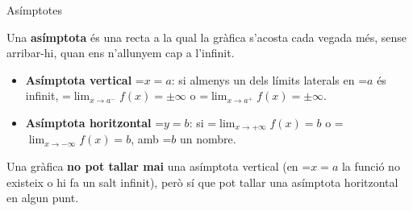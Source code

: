 \documentclass[11pt,a4paper]{article}
\newcommand{\fmm}[1]{\setbox0=\hbox{$#1$}\ifdim\wd0>\linewidth\[#1\]\else\mbox{\box0}\fi}
\begin{document}
  

  
\begin{fmdef}{Asímptotes}
\par\noindent \begin{minipage}[t]{0.48\linewidth}\vspace{0pt}\raggedright Una \textbf{asímptota} és una recta a la qual la gràfica s'acosta cada vegada més, sense arribar-hi, quan ens n'allunyem cap a l'infinit.

          
\begin{itemize}
\item \textbf{Asímptota vertical} \fmm{x=a}: si almenys un dels límits laterals en \fmm{a} és infinit, \fmm{\displaystyle\lim_{x\to a^-}f(x)=\pm\infty} o \fmm{\displaystyle\lim_{x\to a^+}f(x)=\pm\infty}.
\item \textbf{Asímptota horitzontal} \fmm{y=b}: si \fmm{\displaystyle\lim_{x\to+\infty}f(x)=b} o \fmm{\displaystyle\lim_{x\to-\infty}f(x)=b}, amb \fmm{b} un nombre.
\end{itemize}\end{minipage}\hfill\begin{minipage}[t]{0.48\linewidth}\vspace{0pt}\raggedright \begin{center}\end{center}\end{minipage}\par\medskip

      
\begin{fmnote}Una gràfica \textbf{no pot tallar mai} una asímptota vertical (en \fmm{x=a} la funció no existeix o hi fa un salt infinit), però sí que pot tallar una asímptota horitzontal en algun punt.\end{fmnote}
\end{fmdef}
\end{document}
